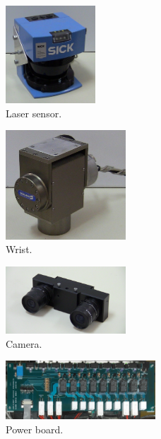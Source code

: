 \begin{figure}[ht]
\centering
 \includegraphics[width=0.3\textwidth]{figures/device_photos/laser.jpg}
\caption{Laser sensor.}
\end{figure}

\begin{figure}[ht]
\centering
 \includegraphics[width=0.4\textwidth]{figures/device_photos/wrist.jpg}
\caption{Wrist.}
\end{figure}

\begin{figure}[ht]
\centering
 \includegraphics[width=0.4\textwidth]{figures/device_photos/camera.jpg}
\caption{Camera.}
\end{figure}

\begin{figure}[ht]
\centering
 \includegraphics[width=0.5\textwidth]{figures/device_photos/powerboard.jpg}
\caption{Power board.}
\end{figure}

